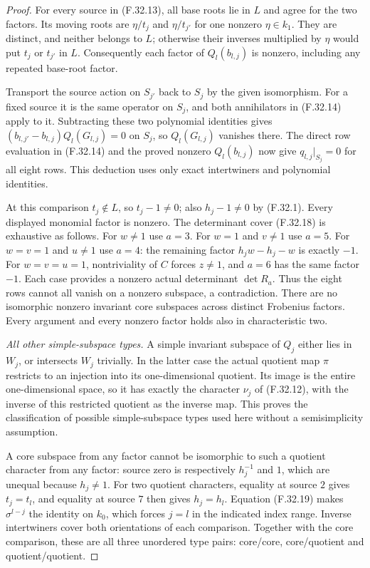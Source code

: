\begin{proof}
For every source in (F.32.13), all base
roots lie in $L$ and agree for the
two factors. Its moving roots are
$\eta/t_j$ and $\eta/t_{j'}$ for one
nonzero $\eta\in k_1$. They are distinct,
and neither belongs to $L$; otherwise
their inverses multiplied by $\eta$
would put $t_j$ or $t_{j'}$ in $L$.
Consequently each factor of $Q_l(b_{l,j})$
is nonzero, including any repeated
base-root factor.

Transport the source action on $S_{j'}$
back to $S_j$ by the given isomorphism.
For a fixed source it is the same
operator on $S_j$, and both annihilators
in (F.32.14) apply to it.
Subtracting these two polynomial
identities gives
$(b_{l,j'}-b_{l,j})Q_l(G_{l,j})=0$
on $S_j$, so $Q_l(G_{l,j})$ vanishes
there. The direct row evaluation in
(F.32.14) and the proved nonzero
$Q_l(b_{l,j})$ now give
$q_{l,j}|_{S_j}=0$ for all eight rows.
This deduction uses only exact
intertwiners and polynomial identities.

At this comparison $t_j\notin L$,
so $t_j-1\ne0$; also $h_j-1\ne0$
by (F.32.1). Every displayed monomial
factor is nonzero. The determinant
cover (F.32.18) is exhaustive as follows.
For $w\ne1$ use $a=3$.
For $w=1$ and $v\ne1$ use $a=5$.
For $w=v=1$ and $u\ne1$ use $a=4$:
the remaining factor $h_jw-h_j-w$
is exactly $-1$.
For $w=v=u=1$, nontriviality of $C$
forces $z\ne1$, and $a=6$ has the
same factor $-1$.
Each case provides a nonzero actual
determinant $\det R_a$.
Thus the eight rows cannot all vanish
on a nonzero subspace, a contradiction.
There are no isomorphic nonzero
invariant core subspaces across
distinct Frobenius factors.
Every argument and every nonzero
factor holds also in characteristic two.

\emph{All other simple-subspace types.}
A simple invariant subspace of $Q_j$
either lies in $W_j$, or intersects
$W_j$ trivially. In the latter case
the actual quotient map $\pi$ restricts
to an injection into its one-dimensional
quotient. Its image is the entire
one-dimensional space, so it has
exactly the character $\nu_j$ of
(F.32.12), with the inverse of this
restricted quotient as the inverse map.
This proves the classification of
possible simple-subspace types used
here without a semisimplicity assumption.

A core subspace from any factor cannot
be isomorphic to such a quotient
character from any factor: source zero
is respectively $h_j^{-1}$ and $1$,
which are unequal because $h_j\ne1$.
For two quotient characters, equality
at source $2$ gives $t_j=t_l$, and
equality at source $7$ then gives
$h_j=h_l$. Equation (F.32.19) makes
$\sigma^{l-j}$ the identity on $k_0$,
which forces $j=l$ in the indicated
index range. Inverse intertwiners cover
both orientations of each comparison.
Together with the core comparison,
these are all three unordered type
pairs: core/core, core/quotient and
quotient/quotient.


\end{proof}
